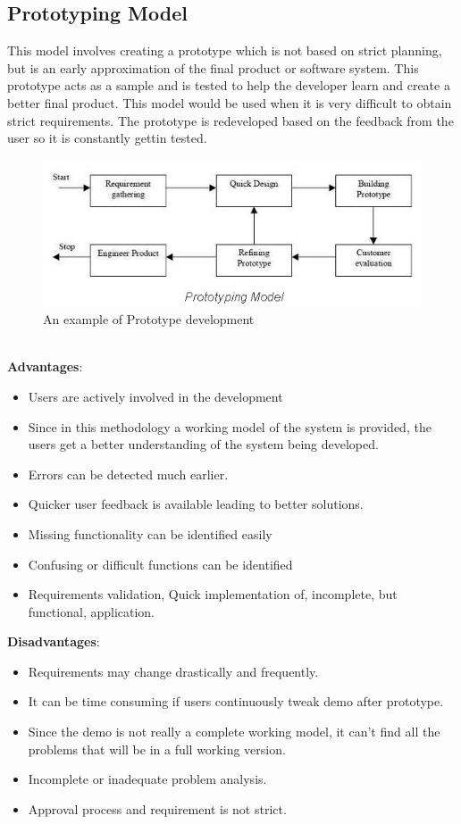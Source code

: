 \documentclass[a4paper, 12pt]{report}
\begin{document}
\subsection{Prototyping Model}
This model involves creating a prototype which is not based on strict planning, but is an early approximation of the final product or software system. This prototype acts as a sample and is tested to help the developer learn and create a better final product. This model would be used when it is very difficult to obtain strict requirements. The prototype is redeveloped based on the feedback from the user so it is constantly gettin tested\cite{prototype}.
\begin{figure}[!htbp]
  \centering
    \includegraphics[width=1.0\textwidth]{Prototype-model.jpg}
    \caption{An example of Prototype development\cite{prototype}}
    \label{fig:prototype-dev}
\end{figure}\\
\textbf{Advantages}:
\begin{itemize}
\item Users are actively involved in the development
\item Since in this methodology a working model of the system is provided, the users get a better understanding of the system being developed.
\item Errors can be detected much earlier.
\item Quicker user feedback is available leading to better solutions.
\item Missing functionality can be identified easily
\item Confusing or difficult functions can be identified
\item Requirements validation, Quick implementation of, incomplete, but
functional, application. 
\end{itemize}
\textbf{Disadvantages}:
\begin{itemize}
\item Requirements may change drastically and frequently.
\item It can be time consuming if users continuously tweak demo after prototype. 
\item Since the demo is not really a complete working model, it can't find all the problems that will be in a full working version.
\item Incomplete or inadequate problem analysis. 
\item Approval process and requirement is not strict.
\end{itemize}
\end{document}

